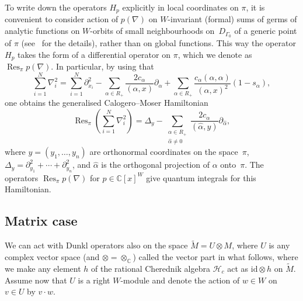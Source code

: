 \documentclass[12pt]{amsart}
\newcommand{\C}{\mathbb C}
\newcommand{\cH}{\mathcal{H}}
\DeclareMathOperator{\Res}{Res}
\numberwithin{equation}{section}
\theoremstyle{definition}
\begin{document}
To write down the operators $H_p$ explicitly in local coordinates on $\pi$, it is convenient to consider action of $p(\nabla)$ on $W$-invariant (formal) sums of germs of analytic functions on $W$-orbits of small neighbourhoods on~$D_{\Gamma_0}$ of a generic point of $\pi$  (see~\cite[Section~3]{Feigin} for the details), rather than on global functions. This way the operator $H_p$ takes the form of a differential operator on $\pi$, which we denote as $\Res_\pi p(\nabla)$. 
In particular, by using that
\begin{equation}\label{q1}
    \sum\limits_{i = 1}^N \nabla_i^2  = \sum\limits_{i = 1}^N \partial_{x_i}^2 - \sum\limits_{\alpha \in R_+} \frac{2 c_{\alpha}}{(\alpha, x)} \partial_{\alpha} + \sum\limits_{\alpha \in R_+}\frac{c_{\alpha} (\alpha, \alpha)}{(\alpha , x)^2} (1 - s_{\alpha}),
\end{equation}
one obtains the generalised Calogero--Moser Hamiltonian  
\begin{equation*}
 \Res_\pi \left( \sum\limits_{i = 1}^N \nabla_i^2 \right) = \Delta_y - \sum\limits_{\substack{\alpha \in R_+ \\ \widehat{\alpha} \neq 0}}\frac{2 c_{\alpha}}{(\widehat{\alpha} , y)} \partial_{\widehat{\alpha}},
\end{equation*}
where $y = (y_1, \ldots, y_n)$ are orthonormal coordinates on the space~$\pi$, $\Delta_y = \partial_{y_1}^2 + \cdots + \partial_{y_n}^2$, and $\widehat{\alpha}$ is the orthogonal projection of
$\alpha$ onto~$\pi$. The operators $\Res_\pi p(\nabla)$ for $p \in \C[x]^W$ give quantum integrals for this Hamiltonian.

\subsection{Matrix case}\label{spin case}
We can act with Dunkl operators also on the space $\widetilde{M} = U \otimes M$,
where $U$ is any complex vector space (and $\otimes = \otimes_\C$) called the vector part in what follows, where we make any element $h$ of the rational Cherednik algebra $\cH_c$ act as $\mathrm{id} \otimes h$ on $\widetilde{M}$. Assume now that $U$ is a right $W$-module and denote the action of $w \in W$ on $v \in U$ by $v \cdot w$. 
\end{document}

